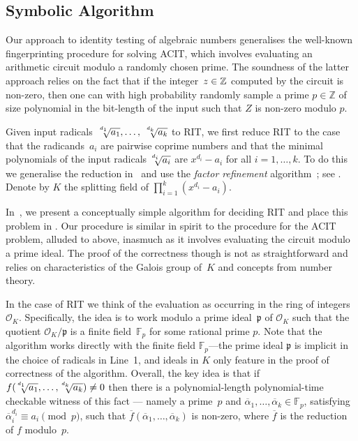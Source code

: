 \subsection{Symbolic Algorithm}
Our approach to identity testing 
of algebraic numbers generalises the well-known
fingerprinting procedure for solving ACIT, which involves evaluating an arithmetic circuit modulo a randomly chosen prime. The soundness of the latter approach relies on the fact that if the integer~$z\in \mathbb{Z}$ computed by the circuit is non-zero, 
then one can with high probability randomly sample a prime $p\in \mathbb{Z}$ of size polynomial in the bit-length of the input such that $Z$ is non-zero modulo $p$. 



\bigskip
{}
Given input radicals~$\mysqrt{d_1}{a_1},\ldots,$ $\mysqrt{d_k}{a_k}$ to RIT, we first reduce RIT to the case that the radicands~$a_i$ are pairwise coprime numbers and that the minimal polynomials of the input radicals $\mysqrt{d_i}{a_i}$ are $x^{d_i}-a_i$ for all $i= 1,\ldots,k$.  To do this we generalise the reduction in~\cite{blomer98} and use the \emph{factor refinement} algorithm~\cite{BACH1993199}; see .
Denote by $K$ the splitting field  of $\prod_{i=1}^k (x^{d_i}-a_i)$.

In~, we present  a conceptually simple algorithm for deciding RIT and  place this problem in {\coNP}.
Our {\coNP} procedure 
 is similar in spirit to the {\coRP}
procedure for the ACIT problem, alluded to above, inasmuch as it involves
evaluating the circuit modulo a prime ideal.
 The proof of the correctness though is not as straightforward and relies on characteristics of the Galois group of~$K$ and
 concepts from number theory. 

In the case of RIT we think of the evaluation as occurring in
the ring of integers $\mathcal{O}_K$. Specifically, the idea is to work modulo a prime ideal~$\mathfrak{p}$ of
$\mathcal{O}_K$ such that the quotient $\mathcal{O}_K / \mathfrak{p}$ is a
finite field~$\mathbb{F}_p$ for some rational prime $p$.
Note that the algorithm works directly with the finite field $\mathbb{F}_p$---the prime ideal 
$\mathfrak{p}$ is implicit in the choice of radicals in 
Line~1, and ideals in $K$ only feature in the 
proof of correctness of the algorithm.   Overall, the key idea is that 
if 
$f(\mysqrt{d_1}{a_1},\ldots,\mysqrt{d_k}{a_k}) \neq 0$
then there is a polynomial-length polynomial-time checkable witness 
of this fact --- namely
a prime~$p$ and 
$\overline{\alpha}_1,\ldots,\overline{\alpha}_k \in \mathbb{F}_p$, satisfying $\overline{\alpha}_i ^ {d_i} \equiv a_i \pmod{p}$, such that $\overline{f}(\overline{\alpha}_1,\ldots,\overline{\alpha}_k )$ is non-zero, where $\overline{f}$ is the reduction of $f$ modulo~$p$.

